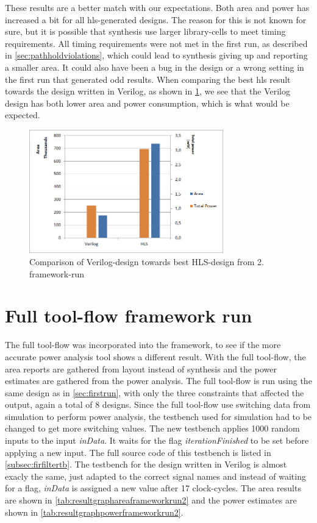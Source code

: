 These results are a better match with our expectations. Both area and power has increased a bit for all \gls{hls}-generated designs. The reason for this is not known for sure, but it is possible that synthesis use larger library-cells to meet timing requirements. All timing requirements were not met in the first run, as described in \cref{sec:pathholdviolations}, which could lead to synthesis giving up and reporting a smaller area. It could also have been a bug in the design or a wrong setting in the first run that generated odd results. When comparing the best \gls{hls} result towards the design written in Verilog, as shown in \cref{fig:resultcomparisonhlsrun2}, we see that the Verilog design has both lower area and power consumption, which is what would be expected.

\begin{figure}[hbpt]
\centering
\includegraphics[width=0.75\textwidth]{../figs/resultComparison2.png}
\caption{\label{fig:resultcomparisonhlsrun2}Comparison of Verilog-design towards best HLS-design from 2. framework-run}
\end{figure}

\section{\label{sec:fullflowresults}Full tool-flow framework run}
The full tool-flow was incorporated into the framework, to see if the more accurate power analysis tool shows a different result. With the full tool-flow, the area reports are gathered from layout instead of synthesis and the power estimates are gathered from the power analysis. The full tool-flow is run using the same design as in \cref{sec:firstrun}, with only the three constraints that affected the output, again a total of 8 designs. Since the full tool-flow use switching data from simulation to perform power analysis, the testbench used for simulation had to be changed to get more switching values. The new testbench applies 1000 random inputs to the input \textit{inData}. It waits for the flag \textit{iterationFinished} to be set before applying a new input. The full source code of this testbench is listed in \cref{subsec:firfiltertb}. The testbench for the design written in Verilog is almost exacly the same, just adapted to the correct signal names and instead of waiting for a flag, \textit{inData} is assigned a new value after 17 clock-cycles. The area results are shown in \cref{tab:resultgraphareaframeworkrun2} and the power estimates are shown in \cref{tab:resultgraphpowerframeworkrun2}.

